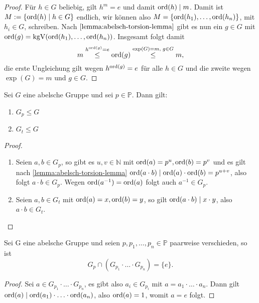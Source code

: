\begin{proof}
    Für $h \in G$ beliebig, gilt $h^m = e$ und damit $\operatorname{ord}(h) \mid m$. Damit ist $M := \{ \operatorname{ord}(h) \mid h \in G \}$ endlich, wir können also $M = \{ \operatorname{ord}(h_1), \hdots, \operatorname{ord}(h_n) \}$, mit $h_i \in G$, schreiben. Nach $\cref{lemma:abelsch-torsion-lemma}$ gibt es nun ein $g \in G$ mit $\operatorname{ord}(g) = \mathrm{kgV}(\operatorname{ord}(h_1), \hdots, \operatorname{ord}(h_n))$. Insgesamt folgt damit $$m \overset{h^{\operatorname{ord}(g)} = e}{\leq} \operatorname{ord}(g) \overset{\exp(G) = m,\; g \in G}{\leq} m,$$ die erste Ungleichung gilt wegen $h^{\operatorname{ord}(g)}=e$ für alle $h\in G$ und die zweite wegen $\exp(G)=m$ und $g\in G$.
\end{proof}

\begin{lemma} \label{lemma:p-t-anteil-untergruppe}
    Sei $G$ eine abelsche Gruppe und sei $p \in \mathbb{P}$. Dann gilt:
    \begin{enumerate}
        \item $G_p \leq G$
        \item $G_t \leq G$
    \end{enumerate}
\end{lemma}

\begin{proof}{\ }
    \begin{enumerate}
        \item Seien $a, b \in G_p$, so gibt es $u, v \in \mathbb{N}$ mit $\operatorname{ord}(a) = p^u, \operatorname{ord}(b) = p^v$ und es gilt nach \cref{lemma:abelsch-torsion-lemma} $\operatorname{ord}(a \cdot b) \mid \operatorname{ord}(a) \cdot \operatorname{ord}(b) = p^{u+v}$, also folgt $a \cdot b \in G_p$. Wegen $\operatorname{ord}(a^{-1}) = \operatorname{ord}(a)$ folgt auch $a^{-1} \in G_p$.
        \item Seien $a, b \in G_t$ mit $\operatorname{ord}(a) = x, \operatorname{ord}(b) = y$, so gilt $ \operatorname{ord}(a \cdot b) \mid x \cdot y$, also $a \cdot b \in G_t$.
    \end{enumerate}
\end{proof}

\begin{lemma} \label{lemma:p-anteile-verschieden}
    Sei G eine abelsche Gruppe und seien $p, p_1, \hdots, p_n \in \mathbb{P}$ paarweise verschieden, so ist
    $$ G_p \cap ( G_{p_1} \cdot \hdots \cdot G_{p_n} ) = \{ e \}. $$
\end{lemma}

\begin{proof}
    Sei $a \in G_{p_1} \cdot \hdots \cdot G_{p_n}$, es gibt also $a_i \in G_{p_i}$ mit $a = a_1 \cdot \hdots \cdot a_n$. Dann gilt $\operatorname{ord}(a) \mid \operatorname{ord}(a_1) \cdot \hdots \cdot \operatorname{ord}(a_n)$, also $\operatorname{ord}(a) = 1$, womit $a = e$ folgt.
\end{proof}

